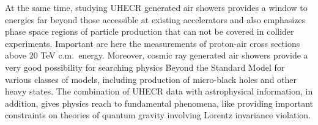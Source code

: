 At the same time, studying UHECR generated air showers provides a window to energies far beyond 
those accessible at existing accelerators and also emphasizes phase space regions of particle production
that can not be covered in collider experiments. Important are here the measurements of proton-air cross 
sections above 20 TeV c.m.~energy. 
Moreover, cosmic ray generated air showers provide a very good possibility for searching physics Beyond the 
Standard Model for various classes of models,  including production of micro-black holes and other heavy states.
The combination of UHECR data with astrophysical information, in addition, gives  physics reach  to 
fundamental phenomena, like providing important constraints on theories of quantum gravity involving 
Lorentz invariance violation.
